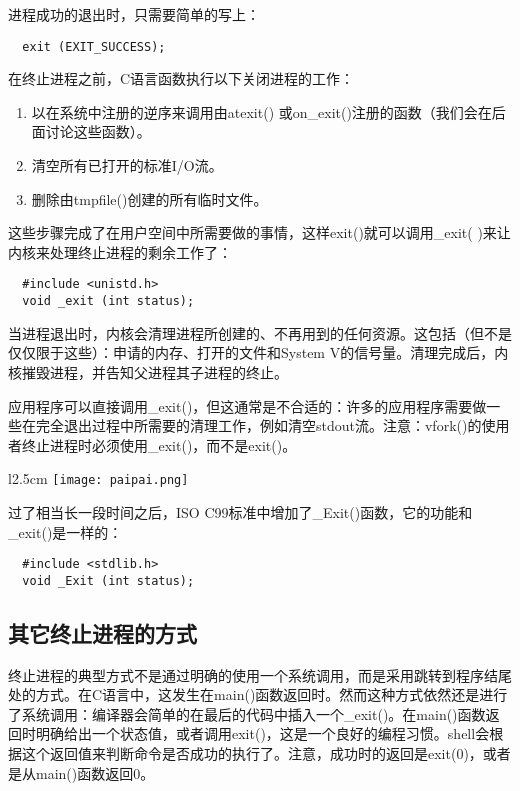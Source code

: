 进程成功的退出时，只需要简单的写上：

\begin{lstlisting}
  exit (EXIT_SUCCESS);
\end{lstlisting}

在终止进程之前，C语言函数执行以下关闭进程的工作：

\begin{enumerate}
\item 以在系统中注册的逆序来调用由atexit() 或on\_exit()注册的函数（我们会在后面讨论这些函数）。
\item 清空所有已打开的标准I/O流。
\item 删除由tmpfile()创建的所有临时文件。
\end{enumerate}

这些步骤完成了在用户空间中所需要做的事情，这样exit()就可以调用\_exit( )来让内核来处理终止进程的剩余工作了：

\begin{lstlisting}
  #include <unistd.h>
  void _exit (int status);
\end{lstlisting}

当进程退出时，内核会清理进程所创建的、不再用到的任何资源。这包括（但不是仅仅限于这些）：申请的内存、打开的文件和System V的信号量。清理完成后，内核摧毁进程，并告知父进程其子进程的终止。

应用程序可以直接调用\_exit()，但这通常是不合适的：许多的应用程序需要做一些在完全退出过程中所需要的清理工作，例如清空stdout流。注意：vfork()的使用者终止进程时必须使用\_exit()，而不是exit()。

\begin{wrapfigure}{l}{2.5cm}
  \texttt{[image: paipai.png]}
\end{wrapfigure}
\mbox{}过了相当长一段时间之后，ISO C99标准中增加了\_Exit()函数，它的功能和\_exit()是一样的：

\begin{lstlisting}
  #include <stdlib.h>
  void _Exit (int status);
\end{lstlisting}

\subsection{其它终止进程的方式}

终止进程的典型方式不是通过明确的使用一个系统调用，而是采用跳转到程序结尾处的方式。在C语言中，这发生在main()函数返回时。然而这种方式依然还是进行了系统调用：编译器会简单的在最后的代码中插入一个\_exit()。在main()函数返回时明确给出一个状态值，或者调用exit()，这是一个良好的编程习惯。shell会根据这个返回值来判断命令是否成功的执行了。注意，成功时的返回是exit(0)，或者是从main()函数返回0。

